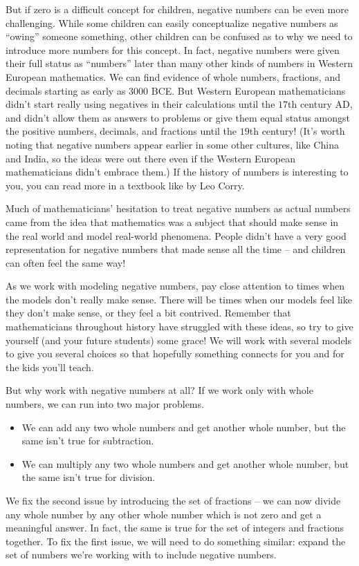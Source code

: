 \documentclass{ximera}
\begin{document}
But if zero is a difficult concept for children, negative numbers can be even more challenging. 
While some children can easily conceptualize negative numbers as ``owing'' someone something, 
other children can be confused as to why we need to introduce more numbers for this concept. 
In fact, negative numbers were given their full status as ``numbers'' later than many other kinds 
of numbers in Western European mathematics. We can find evidence of whole numbers, fractions, 
and decimals starting as early as $3000$ BCE. But Western European mathematicians didn't start 
really using negatives in their calculations until the $17$th century AD, and didn't allow them as 
answers to problems or give them equal status amongst the positive numbers, decimals, and 
fractions until the $19$th century! (It's worth noting that negative numbers appear earlier in some 
other cultures, like China and India, so the ideas were out there even if the Western European 
mathematicians didn't embrace them.) If the history of numbers is interesting to you, you can read 
more in a textbook like  
by Leo Corry.

Much of mathematicians' hesitation to treat negative numbers as actual numbers came 
from the idea that mathematics was a subject that should make sense in the real world 
and model real-world phenomena.  People didn't have a very good representation for 
negative numbers that made sense all the time -- and children can often feel the same way!

As we work with modeling negative numbers, pay close attention to times when the models don't really 
make sense. There will be times when our models feel like they don't make sense, or they feel a 
bit contrived. Remember that mathematicians throughout history have struggled with these ideas, so 
try to give yourself (and your future students) some grace! We will work with several models to give you 
several choices so that hopefully something connects for you and for the kids you'll teach. 


But why work with negative numbers at all? If we work only with whole numbers, we can run into two major problems.
\begin{itemize}
	\item We can add any two whole numbers and get another whole number, but the same isn't true for subtraction.
	\item We can multiply any two whole numbers and get another whole number, but the same isn't true for division.
\end{itemize} 
We fix the second issue by introducing the set of fractions -- we can now divide any whole number by any other whole number which is not zero and get a meaningful answer.  In fact, the same is true for the set of integers and fractions together.  To fix the first issue, we will need to do something similar: expand the set of numbers we're working with to include negative numbers.
\end{document}

